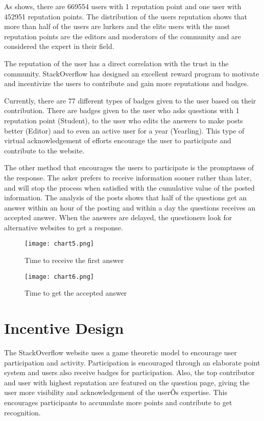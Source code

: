 As  shows, there are 669554 users with 1 reputation point and one user with 452951 reputation points. The distribution of the users reputation shows that more than half of the users are lurkers and the elite users with the most reputation points are the editors and moderators of the community and are considered the expert in their field.

The reputation of the user has a direct correlation with the trust in the community. StackOverflow has designed an excellent reward program to motivate and incentivize the users to contribute and gain more reputations and badges.

Currently, there are 77 different types of badges given to the user based on their contribution. There are badges given to the user who asks questions with 1 reputation point (Student), to the user who edits the answers to make posts better (Editor) and to even an active user for a year (Yearling). This type of virtual acknowledgement of efforts encourage the user to participate and contribute to the website.

The other method that encourages the users to participate is the promptness of the response. The asker prefers to receive information sooner rather than later, and will stop the process when satisfied with the cumulative value of the posted information. The analysis of the posts shows that half of the questions get an answer within an hour of the posting and within a day the questions receives an accepted answer. When the answers are delayed, the questioners look for alternative websites to get a response.

\begin{figure}[!htb]
  \centering
  \texttt{[image: chart5.png]}
  \caption{Time to receive the first answer}
  \label{Figure:figex4h}
\end{figure}

\begin{figure}[!htb]
  \centering
  \texttt{[image: chart6.png]}
  \caption{Time to get the accepted answer}
  \label{Figure:figex4i}
\end{figure}


\section{Incentive Design}

The StackOverflow website uses a game theoretic model to encourage user participation and activity. Participation is encouraged through an elaborate point system and users also receive badges for participation. Also, the top contributor and user with highest reputation are featured on the question page, giving the user more visibility and acknowledgement of the userÕs expertise. This encourages participants to accumulate more points and contribute to get recognition.

